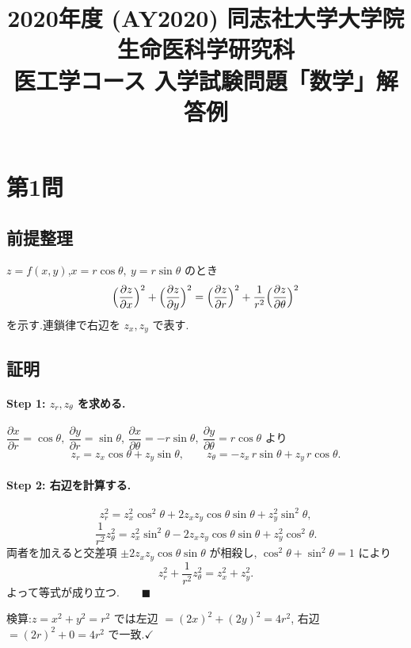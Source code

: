 \documentclass[11pt,a4paper]{article}
\title{2020年度 (AY2020) 同志社大学大学院 生命医科学研究科\\
医工学コース 入学試験問題「数学」解答例}
\author{}
\date{}
\begin{document}
\maketitle
\vspace{-3em}

\section*{第1問}

\subsection*{前提整理}

$z=f(x,y)$,$x=r\cos\theta,\ y=r\sin\theta$ のとき
\[
\Bigl(\frac{\partial z}{\partial x}\Bigr)^2+\Bigl(\frac{\partial z}{\partial y}\Bigr)^2
=\Bigl(\frac{\partial z}{\partial r}\Bigr)^2+\frac1{r^2}\Bigl(\frac{\partial z}{\partial\theta}\Bigr)^2
\]
を示す.連鎖律で右辺を $z_x,z_y$ で表す.

\subsection*{証明}

\paragraph{Step 1: $z_r,z_\theta$ を求める.}
$\dfrac{\partial x}{\partial r}=\cos\theta,\ \dfrac{\partial y}{\partial r}=\sin\theta$,
$\dfrac{\partial x}{\partial\theta}=-r\sin\theta,\ \dfrac{\partial y}{\partial\theta}=r\cos\theta$ より
\[
z_r=z_x\cos\theta+z_y\sin\theta,\qquad
z_\theta=-z_x\,r\sin\theta+z_y\,r\cos\theta.
\]

\paragraph{Step 2: 右辺を計算する.}
\[
z_r^2=z_x^2\cos^2\theta+2z_xz_y\cos\theta\sin\theta+z_y^2\sin^2\theta,
\]
\[
\frac1{r^2}z_\theta^2=z_x^2\sin^2\theta-2z_xz_y\cos\theta\sin\theta+z_y^2\cos^2\theta.
\]
両者を加えると交差項 $\pm2z_xz_y\cos\theta\sin\theta$ が相殺し,
$\cos^2\theta+\sin^2\theta=1$ により
\[
z_r^2+\frac1{r^2}z_\theta^2=z_x^2+z_y^2.
\]
よって等式が成り立つ.$\qquad\blacksquare$

検算:$z=x^2+y^2=r^2$ では左辺 $=(2x)^2+(2y)^2=4r^2$,
右辺 $=(2r)^2+0=4r^2$ で一致.$\checkmark$

\end{document}
